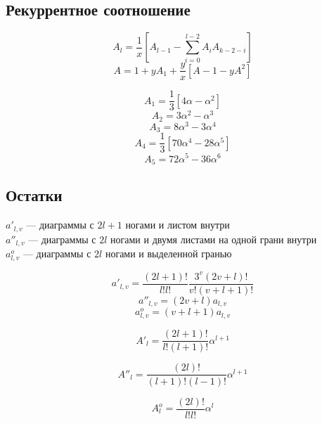 \documentclass[12pt]{article}
\begin{document}
\subsection{Рекуррентное соотношение}

\begin{equation}
A_l = \frac{1}{x} \left[ A_{l - 1} - \sum_{i = 0}^{l - 2} A_i A_{k - 2 - i} \right]
\end{equation}
\begin{equation}
A = 1 + y A_1 + \frac{y}{x} \left[ A - 1 - y A^2 \right]
\end{equation}

$$ A_1 = \frac{1}{3} \left[ 4 \alpha - \alpha^2 \right] $$
$$ A_2 = 3 \alpha^2 - \alpha^3 $$
$$ A_3 = 8 \alpha^3 - 3 \alpha^4 $$
$$ A_4 = \frac{1}{3} \left[ 70 \alpha^4 - 28 \alpha^5 \right] $$
$$ A_5 = 72 \alpha^5 - 36 \alpha^6 $$

\subsection{Остатки}
$a'_{l,v}$ --- диаграммы с $2 l + 1$ ногами и листом внутри \\
$a''_{l,v}$ --- диаграммы с $2 l$ ногами и двумя листами на одной грани внутри \\
$a^o_{l,v}$ --- диаграммы с $2 l$ ногами и выделенной гранью

\begin{equation}
a'_{l,v} = \frac{(2 l + 1)!}{l! l!} \frac{3^v (2 v + l)!}{v! (v + l + 1)!}
\end{equation}
\begin{equation}
a''_{l,v} = (2 v + l) a_{l,v}
\end{equation}
\begin{equation}
a^o_{l,v} = (v + l + 1) a_{l,v}
\end{equation}

\begin{equation}
A'_l = \frac{(2 l + 1)!}{l! (l + 1)!} \alpha^{l + 1}
\end{equation}

\begin{equation}
A''_l = \frac{(2 l)!}{(l + 1)! (l - 1)!} \alpha^{l + 1}
\end{equation}

\begin{equation}
A^o_l = \frac{(2 l)!}{l! l!} \alpha^{l}
\end{equation}
\end{document}
